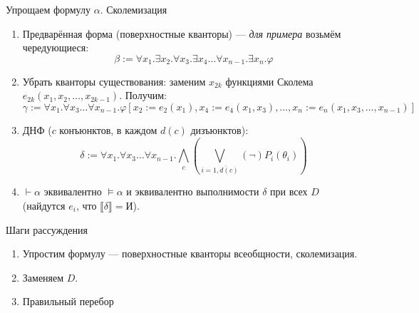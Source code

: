 \documentclass[handout]{beamer}
\begin{document}
\begin{frame}{Упрощаем формулу $\alpha$. Сколемизация}
\begin{enumerate}
\item Предварённая форма (поверхностные кванторы) --- \emph{для примера} возьмём чередующиеся:
$$\beta := \forall x_1.\exists x_2.\forall x_3.\exists x_4\dots \forall x_{n-1}.\exists x_n.\varphi$$


\item Убрать кванторы существования: заменим $x_{2k}$ функциями Сколема $e_{2k}(x_1,x_2,\dots,x_{2k-1})$.
Получим: $$\gamma := \forall x_1.\forall x_3\dots\forall x_{n-1}.\varphi[x_2:=e_2(x_1), x_4:=e_4(x_1,x_3), \dots, x_n := e_n(x_1,x_3,\dots,x_{n-1})]$$


\item ДНФ ($c$ конъюнктов, в каждом $d(c)$ дизъюнктов):
$$\delta := \forall x_1.\forall x_3\dots\forall x_{n-1}.\bigwedge_c\left(\bigvee_{i = \overline{1,d(c)}} (\neg)P_i(\theta_i)\right)$$

\item $\vdash\alpha$ эквивалентно $\models\alpha$ и эквивалентно выполнимости $\delta$ при всех $D$ 
(найдутся $e_i$, что $\llbracket\delta\rrbracket = \text{И}$).

\end{enumerate}
\end{frame}

\begin{frame}{Шаги рассуждения}
\begin{enumerate}
\item \color{gray}Упростим формулу --- поверхностные кванторы всеобщности, сколемизация.
\item \color{black}Заменяем $D$.
\item \color{gray}Правильный перебор
\end{enumerate}
\end{frame}
\end{document}
